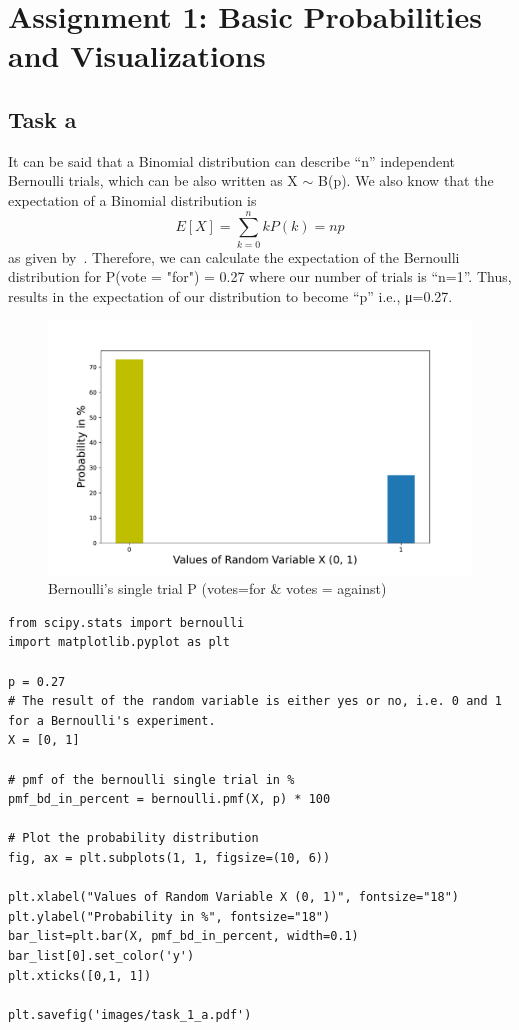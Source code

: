 \chapter{Assignment 1: Basic Probabilities and Visualizations}

\section{Task a}

It can be said that a Binomial distribution can describe “n” independent Bernoulli trials, which can be also written as X ${\sim}$  B(p). We also know that the expectation of a Binomial distribution is \begin{equation}  E [X] = \sum_{k=0}^{n}kP(k)= np \label{task1_a} \end{equation} as given by~\cite{Iubh:2021}. \newline
Therefore, we can calculate the expectation of the Bernoulli distribution for P(vote = "for") = 0.27 where our number of trials is “n=1”. Thus, results in the expectation of our distribution to become “p” i.e., μ=0.27. 

\begin{figure}[h]
\centering
\includegraphics[width=17cm]{pics/task_1_a.pdf}
\caption{Bernoulli’s single trial P (votes=for & votes = against)}\label{fig:task_1_a}
\end{figure}
\FloatBarrier

\newpage

\begin{lstlisting}[caption={: Plotting the PMF for representing Bernoulli’s single trial P (votes=for & votes = against)},label=code_task_1_a]
from scipy.stats import bernoulli
import matplotlib.pyplot as plt

p = 0.27
# The result of the random variable is either yes or no, i.e. 0 and 1 for a Bernoulli's experiment.
X = [0, 1]

# pmf of the bernoulli single trial in %
pmf_bd_in_percent = bernoulli.pmf(X, p) * 100

# Plot the probability distribution
fig, ax = plt.subplots(1, 1, figsize=(10, 6))

plt.xlabel("Values of Random Variable X (0, 1)", fontsize="18")
plt.ylabel("Probability in %", fontsize="18")
bar_list=plt.bar(X, pmf_bd_in_percent, width=0.1)
bar_list[0].set_color('y')
plt.xticks([0,1, 1])

plt.savefig('images/task_1_a.pdf')
\end{lstlisting}

